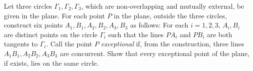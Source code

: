 Let three circles $ \Gamma_1, \Gamma_2, \Gamma_3$, which are non-overlapping and mutually external, be given in the plane. For each point $ P$ in the plane, outside the three circles, construct six points $ A_1, B_1, A_2, B_2, A_3, B_3$ as follows: For each $ i = 1, 2, 3$, $ A_i, B_i$ are distinct points on the circle $ \Gamma_i$ such that the lines $ PA_i$ and $ PB_i$ are both tangents to $ \Gamma_i$. Call the point $ P$ \emph{exceptional} if, from the construction, three lines $ A_1B_1, A_2 B_2, A_3 B_3$ are concurrent. Show that every exceptional point of the plane, if exists, lies on the same circle.